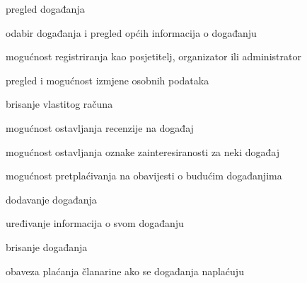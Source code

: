 			
			\begin{packed_enum}
				\item  {}
				
				\begin{packed_enum}
					
					\item pregled događanja
					\item odabir događanja i pregled općih informacija o događanju
					\item mogućnost registriranja kao posjetitelj, organizator ili administrator
					
				\end{packed_enum}
				
				\item  {}
				
				\begin{packed_enum}
					
					\item pregled i mogućnost izmjene osobnih podataka
					\item brisanje vlastitog računa
					\item mogućnost ostavljanja recenzije na događaj
					\item mogućnost ostavljanja oznake zainteresiranosti za neki događaj
					\item mogućnost pretplaćivanja na obavijesti o budućim događanjima
					
					
				\end{packed_enum}
				
				\item  {}
				
				\begin{packed_enum}
									
					\item dodavanje događanja
					\item uređivanje informacija o svom događanju
					\item brisanje događanja
					\item obaveza plaćanja članarine ako se događanja naplaćuju
					
					
				\end{packed_enum}
				
				\item  {}
				
				\begin{packed_enum}	
					

\end{packed_enum}
\end{packed_enum}
